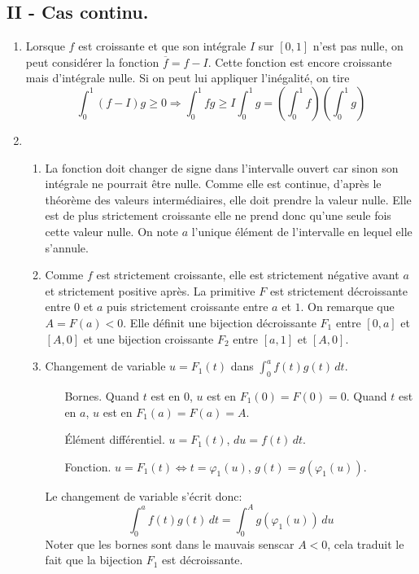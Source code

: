 \subsection*{II - Cas continu.}
\begin{enumerate}
 \item Lorsque $f$ est croissante et que son intégrale $I$ sur $[0,1]$ n'est pas nulle, on peut considérer la fonction $\overline{f}=f-I$. Cette fonction est encore croissante mais d'intégrale nulle. Si on peut lui appliquer l'inégalité, on tire
\begin{displaymath}
 \int_0^1(f - I)g \geq 0 \Rightarrow \int_0^1fg \geq I\int_0^1g = \left( \int_0^1f\right) \left( \int_0^1g\right)  
\end{displaymath}

 \item
\begin{enumerate}
 \item La fonction doit changer de signe dans l'intervalle ouvert car sinon son intégrale ne pourrait être nulle. Comme elle est continue, d'après le théorème des valeurs intermédiaires, elle doit prendre la valeur nulle. Elle est de plus strictement croissante elle ne prend donc qu'une seule fois cette valeur nulle. On note $a$ l'unique élément de l'intervalle en lequel elle s'annule. 
 \item Comme $f$ est strictement croissante, elle est strictement négative avant $a$ et strictement positive après. La primitive $F$ est strictement décroissante entre $0$ et $a$ puis strictement croissante entre $a$ et $1$. On remarque que $A=F(a)<0$. Elle définit une bijection décroissante $F_1$ entre $[0,a]$ et $[A,0]$ et une bijection croissante $F_2$ entre $[a,1]$ et $[A,0]$. 
 \item Changement de variable $u=F_1(t)$ dans $\int_0^af(t)g(t)\,dt$.
\begin{itemize}
 \item[Bornes.] Quand $t$ est en $0$, $u$ est en $F_1(0)=F(0)=0$. Quand $t$ est en $a$, $u$ est en $F_1(a)=F(a)=A$.
 \item[\'Elément différentiel.] $u=F_1(t)$, $du = f(t)\,dt$.
 \item[Fonction.] $u=F_1(t)\Leftrightarrow t = \varphi_1(u)$, $g(t)=g(\varphi_1(u))$.
\end{itemize}
Le changement de variable s'écrit donc:
\begin{displaymath}
 \int_0^af(t)g(t)\,dt = \int_{0}^{A}g(\varphi_1(u))\,du
\end{displaymath}
Noter que les bornes sont \og dans le mauvais sens\fg  car $A<0$, cela traduit le fait que la bijection $F_1$ est décroissante.

\end{enumerate}
\end{enumerate}
